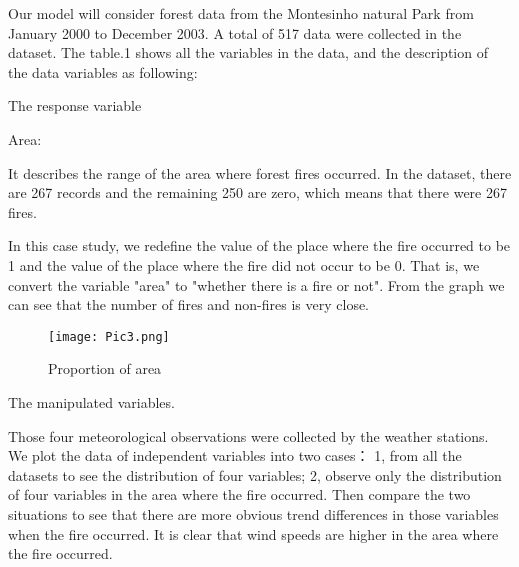 \documentclass[12pt]{article}
\theoremstyle{plain}
\begin{document}
\begin{spacing}{1}
\begin{flushleft}
 Our model will consider forest data from the Montesinho natural Park from January 2000 to December 2003. A total of 517 data were collected in the dataset. The table.1 shows all the variables in the data, and the  description of the data variables as following:
 
 \vspace{2.0mm}
 
 The response variable
  
  \vspace{2.0mm}
  
 Area:
 
 \vspace{2.0mm}
 
 It describes the range of the area where forest fires occurred. In the dataset, there are 267 records and the remaining 250 are zero, which means that there were 267 fires.
 
 \vspace{2.0mm}
 
 
 In this case study, we redefine the value of the place where the fire occurred to be 1 and the value of the place where the fire did not occur to be 0. That is, we convert the variable "area" to "whether there is a fire or not". From the graph we can see that the number of fires and non-fires is very close.
 
 \vspace{2.0mm}
 
  \begin{figure}[htp]
 	\centering  
 	\texttt{[image: Pic3.png]}
 	\caption{Proportion of area}
 	\label{fig:figure1label}
 \end{figure}
 
 \vspace{2.0mm}
 
 
 The manipulated variables.
 
 \vspace{2.0mm}
 
 
 
 Those four meteorological observations were collected by the weather stations. We plot the data of independent variables into two cases： 1, from all the datasets to see the distribution of four variables; 2, observe only the distribution of four variables in the area where the fire occurred. Then compare the two situations to see that there are more obvious trend differences in those variables when the fire occurred. It is clear that wind speeds are higher in the area where the fire occurred.
 

\end{flushleft}
\end{spacing}
\end{document}
